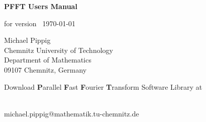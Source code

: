 \documentclass[a4paper,11pt,final,openright,headsepline]{scrreprt}
\numberwithin{figure}{chapter}
\numberwithin{table}{chapter}
\numberwithin{equation}{chapter}
\begin{document}
  \setcounter{equation}{0}

  \begin{titlepage}
    \begin{center}
      \vspace*{3cm}
      {\Huge {\textbf{\textsf{PFFT Users Manual\\}}}}

      \vspace*{1cm}
      for version \pfftversion\, \today

      \vspace*{3cm}
        Michael Pippig\\
        Chemnitz University of Technology\\
        Department of Mathematics\\
        09107 Chemnitz, Germany

      \vspace*{3cm}
      Download \textbf{\Large P}arallel \textbf{\Large F}ast \textbf{\Large F}ourier \textbf{\Large T}ransform Software Library at \\
      {\large \websoft}\\
    \end{center}
    \vfill
    michael.pippig@mathematik.tu-chemnitz.de
  \end{titlepage}

  \tableofcontents
 



  
  
\end{document}
